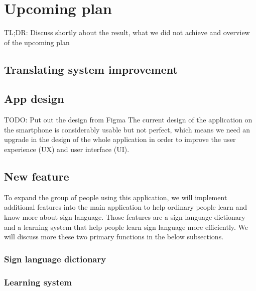\chapter{Upcoming plan}

TL;DR: Discuss shortly about the result, what we did not achieve and overview of the upcoming plan

\section{Translating system improvement}

\section{App design}

TODO: Put out the design from Figma
The current design of the application on the smartphone is considerably usable but not perfect, which means we need an upgrade in the design of the whole application in order to improve the user experience (UX) and user interface (UI).

\section{New feature}

To expand the group of people using this application, we will implement additional features into the main application to help ordinary people learn and know more about sign language. Those features are a sign language dictionary and a learning system that help people learn sign language more efficiently. We will discuss more these two primary functions in the below subsections.

\subsection{Sign language dictionary}


\subsection{Learning system}

